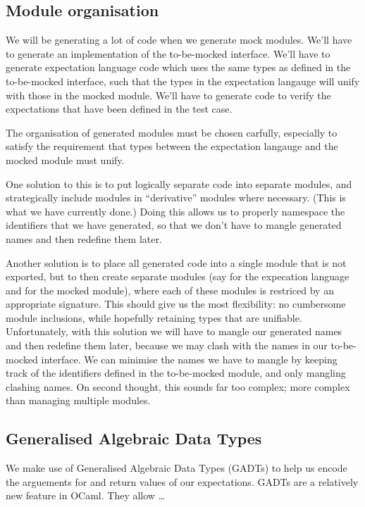 \subsection{Module organisation}

We will be generating a lot of code when we generate mock
modules. We'll have to generate an implementation of the to-be-mocked
interface. We'll have to generate expectation language code which uses
the same types as defined in the to-be-mocked interface, such that
the types in the expectation langauge will unify with those in the
mocked module. We'll have to generate code to verify the expectations
that have been defined in the test case.

The organisation of generated modules must be chosen carfully,
especially to satisfy the requirement that types between the
expectation langauge and the mocked module must unify.

One solution to this is to put logically separate code into separate
modules, and strategically include modules in ``derivative'' modules
where necessary. (This is what we have currently done.) Doing this
allows us to properly namespace the identifiers that we have
generated, so that we don't have to mangle generated names and then
redefine them later.

Another solution is to place all generated code into a single module
that is not exported, but to then create separate modules (say
 for the expecation language and  for the mocked
module), where each of these modules is restriced by an appropriate
signature. This should give us the most flexibility: no cumbersome
module inclusions, while hopefully retaining types that are
unifiable. Unfortunately, with this solution we will have to mangle
our generated names and then redefine them later, because we may clash
with the names in our to-be-mocked interface. We can minimise the
names we have to mangle by keeping track of the identifiers defined in
the to-be-mocked module, and only mangling clashing names. On second
thought, this sounds far too complex; more complex than managing
multiple modules.

\subsection{Generalised Algebraic Data Types}
\label{application:gadt}

We make use of Generalised Algebraic Data Types (GADTs) to help us
encode the arguements for and return values of our expectations. GADTs
are a relatively new feature in OCaml. They allow \dots

